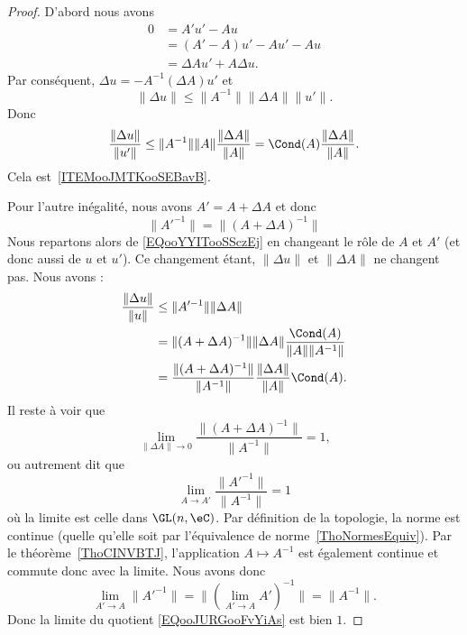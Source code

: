 \begin{proof}
	D'abord nous avons
	\begin{subequations}
		\begin{align}
			0 & =A'u'-Au               \\
			  & =(A'-A)u'-Au'-Au       \\
			  & =\Delta Au'+A\Delta u.
		\end{align}
	\end{subequations}
	Par conséquent, \( \Delta u=-A^{-1}(\Delta A)u'\) et
	\begin{equation}        \label{EQooYYITooSSczEj}
		\| \Delta u \|\leq \| A^{-1} \|\| \Delta A \|\| u' \|.
	\end{equation}
	Donc
	\begin{equation}
		\frac{ \| \Delta u \| }{ \| u' \| }\leq   \| A^{-1} \|\| A \|\frac{ \| \Delta A \| }{ \| A \| }   =\Cond(A)\frac{ \| \Delta A \| }{ \| A \| }.
	\end{equation}
	Cela est~\ref{ITEMooJMTKooSEBavB}.

	Pour l'autre inégalité, nous avons \( A'=A+\Delta A\) et donc
	\begin{equation}
		\| A'^{-1} \|=\| (A+\Delta A)^{-1} \|
	\end{equation}
	Nous repartons alors de \eqref{EQooYYITooSSczEj} en changeant le rôle de \( A\) et \( A'\) (et donc aussi de \( u\) et \( u'\)). Ce changement étant, \( \| \Delta u \|\) et \( \| \Delta A \|\) ne changent pas. Nous avons :
	\begin{subequations}
		\begin{align}
			\frac{ \| \Delta u \| }{ \| u \| } & \leq \| A'^{-1} \|\| \Delta A \|                                                             \\
			                                   & =\| (A+\Delta A)^{-1} \|\| \Delta A \|\frac{ \Cond(A) }{ \| A \|\| A^{-1} \| }               \\
			                                   & =\frac{ \| (A+\Delta A)^{-1} \| }{ \| A^{-1} \| }\frac{ \| \Delta A \| }{ \| A \| }\Cond(A).
		\end{align}
	\end{subequations}
	Il reste à voir que
	\begin{equation}
		\lim_{\| \Delta A \|\to 0} \frac{ \| (A+\Delta A)^{-1} \| }{ \| A^{-1} \| }=1,
	\end{equation}
	ou autrement dit que
	\begin{equation}        \label{EQooJURGooFvYiAs}
		\lim_{A\to A'} \frac{ \| A'^{-1} \| }{ \| A^{-1} \| }=1
	\end{equation}
	où la limite est celle dans \( \GL(n,\eC)\). Par définition de la topologie, la norme est continue (quelle qu'elle soit par l'équivalence de norme~\ref{ThoNormesEquiv}). Par le théorème~\ref{ThoCINVBTJ}, l'application \( A\mapsto A^{-1}\) est également continue et commute donc avec la limite. Nous avons donc
	\begin{equation}
		\lim_{A'\to A}\| A'^{-1} \|=\| (\lim_{A'\to A} A')^{-1} \|=\| A^{-1} \|.
	\end{equation}
	Donc la limite du quotient \eqref{EQooJURGooFvYiAs} est bien \( 1\).
\end{proof}

